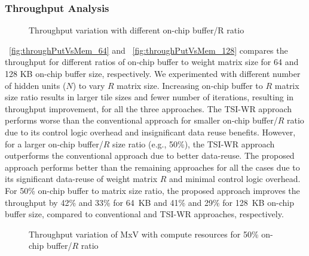 {{{\subsubsection{Throughput Analysis}
\begin{figure}[htb!]
	\centering
	   \hspace{2.0em}
	\caption{Throughput variation with different on-chip buffer/R ratio}	\label{fig:throughputVsMem}
\end{figure}
\figurename{~\ref{fig:throughPutVsMem_64}} and \figurename{~\ref{fig:throughPutVsMem_128}} compares the throughput for different ratios of on-chip buffer to weight matrix size for 64 and 128 KB on-chip buffer size, respectively.  We experimented with different number of hidden units ($N$) to vary $R$ matrix size. Increasing on-chip buffer to $R$ matrix size ratio results in larger tile sizes and fewer number of iterations, resulting in throughput improvement, for all the three approaches. The TSI-WR approach performs worse than the conventional approach for smaller on-chip buffer/$R$ ratio due to its control logic overhead and insignificant data reuse benefits. However, for a larger on-chip buffer/$R$ size ratio (e.g., 50\%), the TSI-WR approach outperforms the conventional approach due to better data-reuse. The proposed approach performs better than the remaining approaches for all the cases due to its significant data-reuse of weight matrix $R$ and minimal control logic overhead.
For 50\% on-chip buffer to matrix size ratio, the proposed approach improves the throughput by 42\% and 33\% for 64~KB and 41\% and 29\% for 128~KB on-chip buffer size, compared to conventional and TSI-WR approaches, respectively.
\begin{figure}[htb!]
	\centering
   \hspace{2.0em}
	\caption{Throughput variation of MxV with compute resources for 50\% on-chip buffer/$R$ ratio}	\label{fig:throughputVsPF}
\end{figure}
}}}
